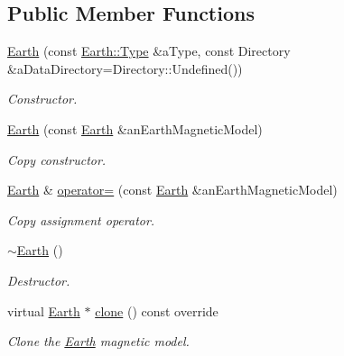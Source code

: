 \subsection*{Public Member Functions}
\begin{DoxyCompactItemize}
\item 
\hyperlink{classostk_1_1physics_1_1environment_1_1magnetic_1_1_earth_ade6f1fc6f3a69543e2bb1921aa8168c5}{Earth} (const \hyperlink{classostk_1_1physics_1_1environment_1_1magnetic_1_1_earth_a30a064d87b6fce338e76aebd3043b6b6}{Earth\+::\+Type} \&a\+Type, const Directory \&a\+Data\+Directory=Directory\+::\+Undefined())
\begin{DoxyCompactList}\small\item\em Constructor. \end{DoxyCompactList}\item 
\hyperlink{classostk_1_1physics_1_1environment_1_1magnetic_1_1_earth_a0d12c37ce2e12e778a01d5c79dcfd355}{Earth} (const \hyperlink{classostk_1_1physics_1_1environment_1_1magnetic_1_1_earth}{Earth} \&an\+Earth\+Magnetic\+Model)
\begin{DoxyCompactList}\small\item\em Copy constructor. \end{DoxyCompactList}\item 
\hyperlink{classostk_1_1physics_1_1environment_1_1magnetic_1_1_earth}{Earth} \& \hyperlink{classostk_1_1physics_1_1environment_1_1magnetic_1_1_earth_ad7ce781762b59980fb255b3b2a3f6aca}{operator=} (const \hyperlink{classostk_1_1physics_1_1environment_1_1magnetic_1_1_earth}{Earth} \&an\+Earth\+Magnetic\+Model)
\begin{DoxyCompactList}\small\item\em Copy assignment operator. \end{DoxyCompactList}\item 
\hyperlink{classostk_1_1physics_1_1environment_1_1magnetic_1_1_earth_a980e325b00a1dc56103d18c3199d0e33}{$\sim$\+Earth} ()
\begin{DoxyCompactList}\small\item\em Destructor. \end{DoxyCompactList}\item 
virtual \hyperlink{classostk_1_1physics_1_1environment_1_1magnetic_1_1_earth}{Earth} $\ast$ \hyperlink{classostk_1_1physics_1_1environment_1_1magnetic_1_1_earth_ac4b57f94304595595fc3eebb0dd0d050}{clone} () const override
\begin{DoxyCompactList}\small\item\em Clone the \hyperlink{classostk_1_1physics_1_1environment_1_1magnetic_1_1_earth}{Earth} magnetic model. \end{DoxyCompactList}\item 

\end{DoxyCompactItemize}
